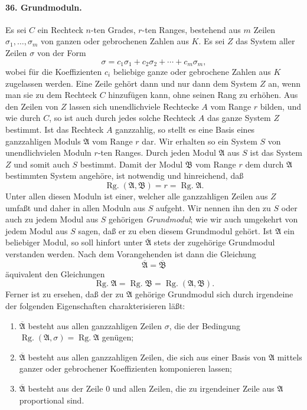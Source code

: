 \documentclass[11pt]{article}
\newcommand{\Rg}{\operatorname{Rg.}}
\begin{document}
\paragraph{36. Grundmoduln.}
Es sei $C$ ein Rechteck $n$-ten Grades, $r$-ten Ranges, bestehend aus $m$ Zeilen $\sigma_1,\ldots,\sigma_m$ von ganzen oder gebrochenen Zahlen aus $K$. Es sei $Z$ das System aller Zeilen $\sigma$ von der Form
\[
\sigma=c_1\sigma_1+c_2\sigma_2+\cdots+c_m\sigma_m,
\]
wobei für die Koeffizienten $c_i$ beliebige ganze oder gebrochene Zahlen aus $K$ zugelassen werden. Eine Zeile gehört dann und nur dann dem System $Z$ an, wenn man sie zu dem Rechteck $C$ hinzufügen kann, ohne seinen Rang zu erhöhen. Aus den Zeilen von $Z$ lassen sich unendlichviele Rechtecke $A$ vom Range $r$ bilden, und wie durch $C$, so ist auch durch jedes solche Rechteck $A$ das ganze System $Z$ bestimmt. Ist das Rechteck $A$ ganzzahlig, so stellt es eine Basis eines ganzzahligen Moduls $\mathfrak A$ vom Range $r$ dar. Wir erhalten so ein System $S$ von unendlichvielen Moduln $r$-ten Ranges. Durch jeden Modul $\mathfrak A$ aus $S$ ist das System $Z$ und somit auch $S$ bestimmt. Damit der Modul $\mathfrak B$ vom Range $r$ dem durch $\mathfrak A$ bestimmten System angehöre, ist notwendig und hinreichend, daß
\[
\Rg(\mathfrak A,\mathfrak B)=r=\Rg\mathfrak A.
\]
Unter allen diesen Moduln ist einer, welcher alle ganzzahligen Zeilen aus $Z$ umfaßt und daher in allen Moduln aus $S$ aufgeht. Wir nennen ihn den zu $S$ oder auch zu jedem Modul aus $S$ gehörigen \emph{Grundmodul}; wie wir auch umgekehrt von jedem Modul aus $S$ sagen, daß er zu eben diesem Grundmodul gehört. Ist $\mathfrak A$ ein beliebiger Modul, so soll hinfort unter $\overline{\mathfrak A}$ stets der zugehörige Grundmodul verstanden werden. Nach dem Vorangehenden ist dann die Gleichung
\[
\overline{\mathfrak A}=\overline{\mathfrak B}
\]
äquivalent den Gleichungen
\[
\Rg\mathfrak A=\Rg\mathfrak B=\Rg(\mathfrak A,\mathfrak B).
\]
Ferner ist zu ersehen, daß der zu $\mathfrak A$ gehörige Grundmodul sich durch irgendeine der folgenden Eigenschaften charakterisieren läßt:
\begin{enumerate}
\item[a)] $\overline{\mathfrak A}$ besteht aus allen ganzzahligen Zeilen $\sigma$, die der Bedingung $\Rg(\mathfrak A,\sigma)=\Rg\mathfrak A$ genügen;
\item[b)] $\overline{\mathfrak A}$ besteht aus allen ganzzahligen Zeilen, die sich aus einer Basis von $\mathfrak A$ mittels ganzer oder gebrochener Koeffizienten komponieren lassen;
\item[c)] $\overline{\mathfrak A}$ besteht aus der Zeile $0$ und allen Zeilen, die zu irgendeiner Zeile aus $\mathfrak A$ proportional sind.
\end{enumerate}
\end{document}
